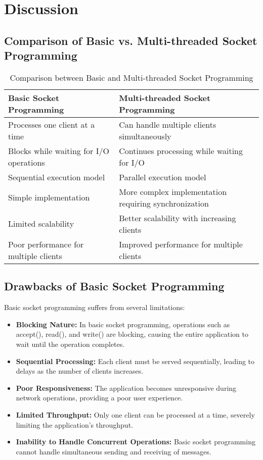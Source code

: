 \documentclass[12pt,a4paper]{article}
\begin{document}
\section{Discussion}
\subsection{Comparison of Basic vs. Multi-threaded Socket Programming}
\begin{table}[H]
    \centering
    \begin{tabular}{|p{5cm}|p{5cm}|}
        \hline
        \textbf{Basic Socket Programming} & \textbf{Multi-threaded Socket Programming} \\
        \hline
        Processes one client at a time & Can handle multiple clients simultaneously \\
        \hline
        Blocks while waiting for I/O operations & Continues processing while waiting for I/O \\
        \hline
        Sequential execution model & Parallel execution model \\
        \hline
        Simple implementation & More complex implementation requiring synchronization \\
        \hline
        Limited scalability & Better scalability with increasing clients \\
        \hline
        Poor performance for multiple clients & Improved performance for multiple clients \\
        \hline
    \end{tabular}
    \caption{Comparison between Basic and Multi-threaded Socket Programming}
    \label{tab:comparison}
\end{table}

\subsection{Drawbacks of Basic Socket Programming}
Basic socket programming suffers from several limitations:
\begin{itemize}
    \item \textbf{Blocking Nature:} In basic socket programming, operations such as accept(), read(), and write() are blocking, causing the entire application to wait until the operation completes.
    
    \item \textbf{Sequential Processing:} Each client must be served sequentially, leading to delays as the number of clients increases.
    
    \item \textbf{Poor Responsiveness:} The application becomes unresponsive during network operations, providing a poor user experience.
    
    \item \textbf{Limited Throughput:} Only one client can be processed at a time, severely limiting the application's throughput.
    
    \item \textbf{Inability to Handle Concurrent Operations:} Basic socket programming cannot handle simultaneous sending and receiving of messages.
\end{itemize}
\end{document}
